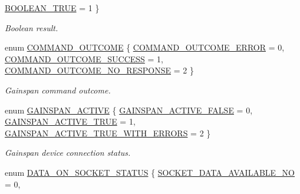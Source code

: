 \begin{DoxyCompactItemize}
\hyperlink{group__wireless__interface_gga8bb14f539316556e9d58cd68b262f7b0af6e8671511417cd19bc2c2ae55f0bd04}{B\+O\+O\+L\+E\+A\+N\+\_\+\+T\+R\+UE} = 1
 \}\begin{DoxyCompactList}\small\item\em Boolean result. \end{DoxyCompactList}
\item 
enum \hyperlink{group__wireless__interface_gab9cb187a993cee0dab2a6e72223e00d1}{C\+O\+M\+M\+A\+N\+D\+\_\+\+O\+U\+T\+C\+O\+ME} \{ \hyperlink{group__wireless__interface_ggab9cb187a993cee0dab2a6e72223e00d1ac7ddb08e89ec165de0d2bd13a5507281}{C\+O\+M\+M\+A\+N\+D\+\_\+\+O\+U\+T\+C\+O\+M\+E\+\_\+\+E\+R\+R\+OR} = 0, 
\hyperlink{group__wireless__interface_ggab9cb187a993cee0dab2a6e72223e00d1a9d5efd9e89d57eaf5caf4930f96a5b06}{C\+O\+M\+M\+A\+N\+D\+\_\+\+O\+U\+T\+C\+O\+M\+E\+\_\+\+S\+U\+C\+C\+E\+SS} = 1, 
\hyperlink{group__wireless__interface_ggab9cb187a993cee0dab2a6e72223e00d1af80d17736f367158c13f64f2e24a48a1}{C\+O\+M\+M\+A\+N\+D\+\_\+\+O\+U\+T\+C\+O\+M\+E\+\_\+\+N\+O\+\_\+\+R\+E\+S\+P\+O\+N\+SE} = 2
 \}\begin{DoxyCompactList}\small\item\em Gainspan command outcome. \end{DoxyCompactList}
\item 
enum \hyperlink{group__wireless__interface_ga2d6a1c69aec7812a8dc23ed99f96558e}{G\+A\+I\+N\+S\+P\+A\+N\+\_\+\+A\+C\+T\+I\+VE} \{ \hyperlink{group__wireless__interface_gga2d6a1c69aec7812a8dc23ed99f96558eac5e8200121882454bb5a1eef24d3dec1}{G\+A\+I\+N\+S\+P\+A\+N\+\_\+\+A\+C\+T\+I\+V\+E\+\_\+\+F\+A\+L\+SE} = 0, 
\hyperlink{group__wireless__interface_gga2d6a1c69aec7812a8dc23ed99f96558ea8b9a4426f4574b1bb24b0bc55abfc0d9}{G\+A\+I\+N\+S\+P\+A\+N\+\_\+\+A\+C\+T\+I\+V\+E\+\_\+\+T\+R\+UE} = 1, 
\hyperlink{group__wireless__interface_gga2d6a1c69aec7812a8dc23ed99f96558ea41c2f910c639fb4214bfbe08c342d6e1}{G\+A\+I\+N\+S\+P\+A\+N\+\_\+\+A\+C\+T\+I\+V\+E\+\_\+\+T\+R\+U\+E\+\_\+\+W\+I\+T\+H\+\_\+\+E\+R\+R\+O\+RS} = 2
 \}\begin{DoxyCompactList}\small\item\em Gainspan device connection status. \end{DoxyCompactList}
\item 
enum \hyperlink{group__wireless__interface_ga89e48ba1366c2ef59edbdf4e84df52bb}{D\+A\+T\+A\+\_\+\+O\+N\+\_\+\+S\+O\+C\+K\+E\+T\+\_\+\+S\+T\+A\+T\+US} \{ \hyperlink{group__wireless__interface_gga89e48ba1366c2ef59edbdf4e84df52bba439dd79d2d29db795e8af9121d1d26dd}{S\+O\+C\+K\+E\+T\+\_\+\+D\+A\+T\+A\+\_\+\+A\+V\+A\+I\+L\+A\+B\+L\+E\+\_\+\+NO} = 0, 

\end{DoxyCompactItemize}
